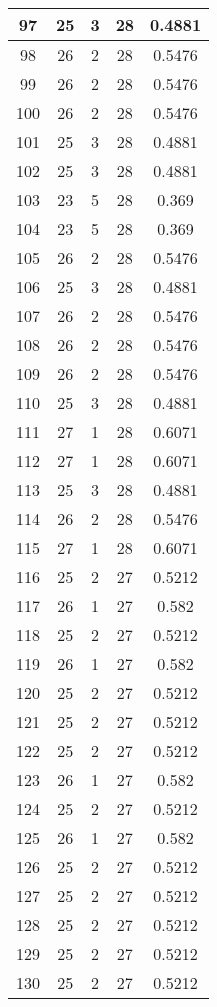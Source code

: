 \documentclass[letterpaper, 12pt]{article}
\begin{document}
\begin{longtable}{|c|c|c|c|c|}
\hline
97 & 25 & 3 & 28 & 0.4881 \\
\hline
98 & 26 & 2 & 28 & 0.5476 \\
\hline
99 & 26 & 2 & 28 & 0.5476 \\
\hline
100 & 26 & 2 & 28 & 0.5476 \\
\hline
101 & 25 & 3 & 28 & 0.4881 \\
\hline
102 & 25 & 3 & 28 & 0.4881 \\
\hline
103 & 23 & 5 & 28 & 0.369 \\
\hline
104 & 23 & 5 & 28 & 0.369 \\
\hline
105 & 26 & 2 & 28 & 0.5476 \\
\hline
106 & 25 & 3 & 28 & 0.4881 \\
\hline
107 & 26 & 2 & 28 & 0.5476 \\
\hline
108 & 26 & 2 & 28 & 0.5476 \\
\hline
109 & 26 & 2 & 28 & 0.5476 \\
\hline
110 & 25 & 3 & 28 & 0.4881 \\
\hline
111 & 27 & 1 & 28 & 0.6071 \\
\hline
112 & 27 & 1 & 28 & 0.6071 \\
\hline
113 & 25 & 3 & 28 & 0.4881 \\
\hline
114 & 26 & 2 & 28 & 0.5476 \\
\hline
115 & 27 & 1 & 28 & 0.6071 \\
\hline
116 & 25 & 2 & 27 & 0.5212 \\
\hline
117 & 26 & 1 & 27 & 0.582 \\
\hline
118 & 25 & 2 & 27 & 0.5212 \\
\hline
119 & 26 & 1 & 27 & 0.582 \\
\hline
120 & 25 & 2 & 27 & 0.5212 \\
\hline
121 & 25 & 2 & 27 & 0.5212 \\
\hline
122 & 25 & 2 & 27 & 0.5212 \\
\hline
123 & 26 & 1 & 27 & 0.582 \\
\hline
124 & 25 & 2 & 27 & 0.5212 \\
\hline
125 & 26 & 1 & 27 & 0.582 \\
\hline
126 & 25 & 2 & 27 & 0.5212 \\
\hline
127 & 25 & 2 & 27 & 0.5212 \\
\hline
128 & 25 & 2 & 27 & 0.5212 \\
\hline
129 & 25 & 2 & 27 & 0.5212 \\
\hline
130 & 25 & 2 & 27 & 0.5212 \\

\end{longtable}
\end{document}
